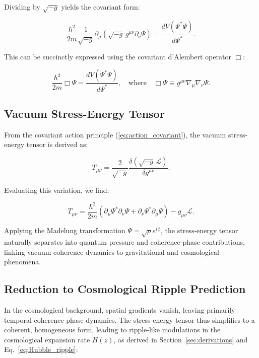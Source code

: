 Dividing by $\sqrt{-g}$ yields the covariant form:

\begin{equation}
\frac{\hbar^2}{2m}\frac{1}{\sqrt{-g}}\partial_\mu\left(\sqrt{-g}\,g^{\mu\nu}\partial_\nu\Psi\right) = \frac{dV(\Psi^*\Psi)}{d\Psi^*}.
\label{eq:covariant_field_eq}
\end{equation}

This can be succinctly expressed using the covariant d'Alembert operator $\Box$:

\begin{equation}
\frac{\hbar^2}{2m}\Box\Psi = \frac{dV(\Psi^*\Psi)}{d\Psi^*},\quad\text{where}\quad \Box\Psi \equiv g^{\mu\nu}\nabla_\mu\nabla_\nu\Psi.
\label{eq:covariant_dalembert_eq}
\end{equation}

\subsection{Vacuum Stress-Energy Tensor}

From the covariant action principle (\ref{eq:action_covariant}), the vacuum stress-energy tensor is derived as:

\begin{equation}
T_{\mu\nu} = \frac{2}{\sqrt{-g}}\frac{\delta(\sqrt{-g}\,\mathcal{L})}{\delta g^{\mu\nu}}.
\label{eq:stress_energy_definition}
\end{equation}

Evaluating this variation, we find:

\begin{equation}
T_{\mu\nu} = \frac{\hbar^2}{2m}\left(\partial_\mu\Psi^*\partial_\nu\Psi + \partial_\nu\Psi^*\partial_\mu\Psi\right) - g_{\mu\nu}\mathcal{L}.
\label{eq:stress_energy}
\end{equation}

Applying the Madelung transformation $\Psi=\sqrt{\rho}e^{i\phi}$, the stress-energy tensor naturally separates into quantum pressure and coherence-phase contributions, linking vacuum coherence dynamics to gravitational and cosmological phenomena.

\subsection{Reduction to Cosmological Ripple Prediction}

In the cosmological background, spatial gradients vanish, leaving primarily temporal coherence-phase dynamics. The stress energy tensor thus simplifies to a coherent, homogeneous form, leading to ripple-like modulations in the cosmological expansion rate $H(z)$, as derived in Section~\ref{sec:derivations} and Eq.~\eqref{eq:Hubble_ripple}:

